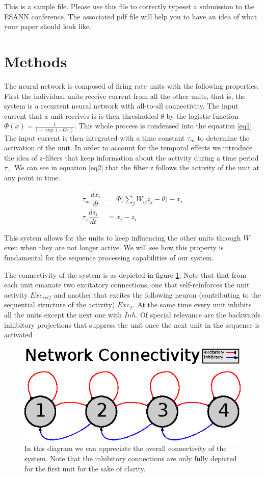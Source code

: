 \documentclass{esannV2}
\begin{document}
This is a sample file. Please use this file to correctly typeset a
submission to the ESANN conference. The associated pdf file will
help you to have an idea of what your paper should look like.

\section{Methods}
The neural network is composed of firing rate units with the following properties. First the individual units receive current from all the other units, that is, the system is a recurrent neural network with all-to-all connectivity. The input current that a unit receives is  is then  thresholded $\theta$ by the logistic function $\Phi(x) = \frac{1}{1 + \exp(-Gx)}$. This whole process is condensed into the equation \ref{eq1}. The input current is then integrated with a time constant $\tau_m$ to determine the activation of the unit. In order to account for the temporal effects we introduce the idea of z-filters that keep information about the activity during a time period $\tau_z$. We can see in equation \ref{eq2} that the filter z follows the activity of the unit at any point in time.

\begin{align}
\tau_m \dfrac{dx_i}{dt} &= \Phi\Big(\sum_{j} W_{ij} z_j - \theta \Big) - x_i \label{eq1} \\ 
\tau_z \dfrac{dz_i}{dt} &= x_i - z_i \label{eq2}
\end{align}

This system allows for the units to keep influencing the other units through $W$ even when they are not longer active. We will see how this property is fundamental for the sequence processing capabilities of our system. 

The connectivity of the system is as depicted in figure \ref{Fig:diagram}. Note that that from each unit emanate two excitatory connections, one that self-reinforces the unit activity $Exc_{self}$ and another that excites the following neuron (contributing to the sequential structure of the activity) $Exc_T$. At the same time every unit inhibits all the units except the next one with $Inh$. Of special relevance are the backwards inhibitory projections that suppress the unit once the next unit in the sequence is activated 

\begin{figure}[h!]
\centering
\includegraphics[scale=1.5]{diagram.eps}
\caption{In this diagram we can appreciate the overall connectivity of the system. Note that the inhibitory connections are only fully depicted for the first unit for the sake of clarity.}\label{Fig:diagram}
\end{figure}
\end{document}

